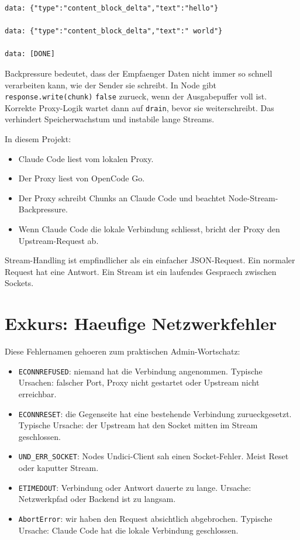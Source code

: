 \documentclass[11pt,a4paper]{article}
\newcommand{\code}[1]{\texttt{#1}}
\begin{document}
\begin{verbatim}
data: {"type":"content_block_delta","text":"hello"}

data: {"type":"content_block_delta","text":" world"}

data: [DONE]
\end{verbatim}

Backpressure bedeutet, dass der Empfaenger Daten nicht immer so schnell
verarbeiten kann, wie der Sender sie schreibt. In Node gibt
\code{response.write(chunk)} \code{false} zurueck, wenn der Ausgabepuffer voll
ist. Korrekte Proxy-Logik wartet dann auf \code{drain}, bevor sie
weiterschreibt. Das verhindert Speicherwachstum und instabile lange Streams.

In diesem Projekt:

\begin{itemize}
  \item Claude Code liest vom lokalen Proxy.
  \item Der Proxy liest von OpenCode Go.
  \item Der Proxy schreibt Chunks an Claude Code und beachtet Node-Stream-Backpressure.
  \item Wenn Claude Code die lokale Verbindung schliesst, bricht der Proxy den Upstream-Request ab.
\end{itemize}

Stream-Handling ist empfindlicher als ein einfacher JSON-Request. Ein normaler
Request hat eine Antwort. Ein Stream ist ein laufendes Gespraech zwischen
Sockets.

\section{Exkurs: Haeufige Netzwerkfehler}

Diese Fehlernamen gehoeren zum praktischen Admin-Wortschatz:

\begin{itemize}
  \item \code{ECONNREFUSED}: niemand hat die Verbindung angenommen. Typische Ursachen: falscher Port, Proxy nicht gestartet oder Upstream nicht erreichbar.
  \item \code{ECONNRESET}: die Gegenseite hat eine bestehende Verbindung zurueckgesetzt. Typische Ursache: der Upstream hat den Socket mitten im Stream geschlossen.
  \item \code{UND\_ERR\_SOCKET}: Nodes Undici-Client sah einen Socket-Fehler. Meist Reset oder kaputter Stream.
  \item \code{ETIMEDOUT}: Verbindung oder Antwort dauerte zu lange. Ursache: Netzwerkpfad oder Backend ist zu langsam.
  \item \code{AbortError}: wir haben den Request absichtlich abgebrochen. Typische Ursache: Claude Code hat die lokale Verbindung geschlossen.
\end{itemize}
\end{document}
